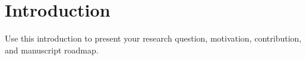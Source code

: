 \chapter*{Introduction}

Use this introduction to present your research question, motivation, contribution, and manuscript roadmap.
